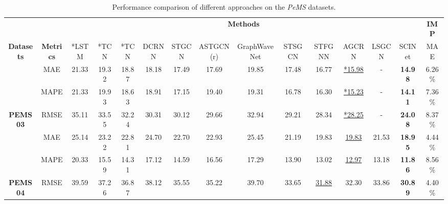 \documentclass{article}
\begin{document}
\begin{table*}[h]	
\caption{Performance comparison of different approaches on the \emph{PeMS} datasets.}
\begin{threeparttable} \resizebox{\textwidth}{!}
{
\begin{tabular}{c|c|c|c|c|c|c|c|c|c|c|c|c|c|c}
\hline
                                    &                                    & \multicolumn{12}{c|}{\textbf{Methods}}                                                                                                                                                         & \textbf{IMP}                      \\ \cline{3-15} 
\multirow{-2}{*}{\textbf{Datasets}} & \multirow{-2}{*}{\textbf{Metrics}} & *LSTM  & *TCN  & *TCN & DCRNN & STGCN & ASTGCN(r) & GraphWaveNet & STSGCN & STFGNN                                     & AGCRN                                       & LSGCN & SCINet         & MAE          \\ \hline
                                    & MAE                                & 21.33 & 19.32 & 18.87 & 18.18 & 17.49 & 17.69     & 19.85        & 17.48  & 16.77                                       & {\color[RGB]{0, 100, 148} \underline{ *15.98}} & -     & \textbf{14.98} & {\color[RGB]{230, 57, 70}  6.26\%}  \\ & MAPE                               & 21.33 & 19.93 & 18.63 & 18.91 & 17.15 & 19.40     & 19.31        & 16.78  & 16.30                                       & {\color[RGB]{0, 100, 148} \underline{ *15.23}} & -     & \textbf{14.11} & {\color[RGB]{230, 57, 70}  7.36\%}  \\ \multirow{-3}{*}{\textbf{PEMS03}}   & RMSE                               & 35.11 & 33.55 & 32.24 & 30.31 & 30.12 & 29.66     & 32.94        & 29.21  & 28.34 & {\color[RGB]{0, 100, 148} \underline{ *28.25 }}                                      & -     & \textbf{24.08} & {\color[RGB]{230, 57, 70}  8.37\%}  \\ \hline
                                    & MAE                                & 25.14 & 23.22 & 22.81 & 24.70 & 22.70 & 22.93     & 25.45        & 21.19  & 19.83                                    & {\color[RGB]{0, 100, 148} \underline{ 19.83}} & 21.53 & \textbf{18.95} & {\color[RGB]{230, 57, 70}  4.44\%}  \\ & MAPE                               & 20.33 & 15.59 & 14.31 & 17.12 & 14.59 & 16.56     & 17.29        & 13.90  & 13.02                                       & {\color[RGB]{0, 100, 148} \underline{ 12.97}} & 13.18 & \textbf{11.86} & {\color[RGB]{230, 57, 70} 8.56\%} \\ \multirow{-3}{*}{\textbf{PEMS04}}   & RMSE                               & 39.59 & 37.26 & 36.87 & 38.12 & 35.55 & 35.22     & 39.70        & 33.65  & {\color[RGB]{0, 100, 148} \underline{ 31.88}}                                       & 32.30 & 33.86 & \textbf{30.89} & {\color[RGB]{230, 57, 70}  4.40\%}  \\ \hline

\end{tabular}}
\end{threeparttable}
\end{table*}
\end{document}
